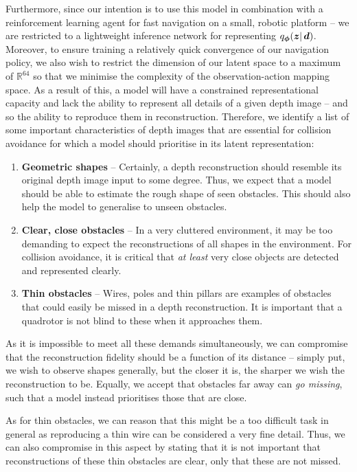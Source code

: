 Furthermore, since our intention is to use this model in combination with a reinforcement learning agent for fast navigation on a small, robotic platform -- we are restricted to a lightweight inference network for representing $q_{\boldsymbol{\phi}}(\boldsymbol{z} |\, {\boldsymbol{d}})$.
Moreover, to ensure training a relatively quick convergence of our navigation policy, we also wish to restrict the dimension of our latent space to a maximum of $\mathbb{R}^{64}$ so that we minimise the complexity of the observation-action mapping space. 
As a result of this, a model will have a constrained representational capacity and lack the ability to represent all details of a given depth image -- and so the ability to reproduce them in reconstruction. Therefore, we identify a list of some important characteristics of depth images that are essential for collision avoidance for which a model should prioritise in its latent representation:
\begin{enumerate}
    \item \textbf{Geometric shapes} -- Certainly, a depth reconstruction should resemble its original depth image input to some degree. Thus, we expect that a model should be able to estimate the rough shape of seen obstacles. This should also help the model to generalise to unseen obstacles.
    \item \textbf{Clear, close obstacles} -- In a very cluttered environment, it may be too demanding to expect the reconstructions of all shapes in the environment. For collision avoidance, it is critical that \textit{at least} very close objects are detected and represented clearly. 
    \item \textbf{Thin obstacles} -- Wires, poles and thin pillars are examples of obstacles that could easily be missed in a depth reconstruction. It is important that a quadrotor is not blind to these when it approaches them.
\end{enumerate}

As it is impossible to meet all these demands simultaneously, we can compromise that the reconstruction fidelity should be a function of its distance -- simply put, we wish to observe shapes generally, but the closer it is, the sharper we wish the reconstruction to be. Equally, we accept that obstacles far away can \textit{go missing}, such that a model instead prioritises those that are close.

As for thin obstacles, we can reason that this might be a too difficult task in general as reproducing a thin wire can be considered a very fine detail. Thus, we can also compromise in this aspect by stating that it is not important that reconstructions of these thin obstacles are clear, only that these are not missed.